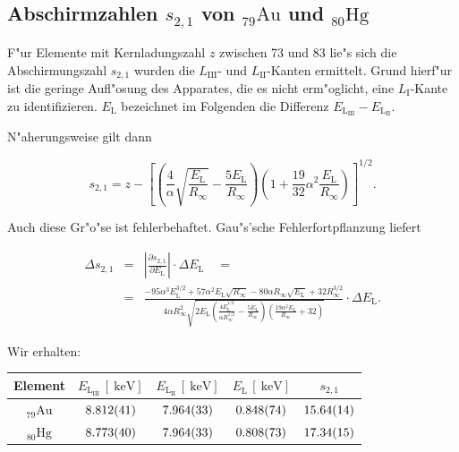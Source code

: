 	\subsection{Abschirmzahlen $s_{2,1}$ von ${}_{79}^{}\mathrm{Au}$ und ${}_{80}^{}\mathrm{Hg}$}
		\label{subsec:abschirm2}
		F"ur Elemente mit Kernladungszahl $z$ zwischen 73 und 83 lie"s sich die Abschirmungszahl $s_{2,1}$ wurden die $L_\mathrm{III}$- und $L_\mathrm{II}$-Kanten ermittelt.
		Grund hierf"ur ist die geringe Aufl"osung des Apparates, die es nicht erm"oglicht, eine $L_\mathrm{I}$-Kante zu identifizieren.
		$E_\mathrm{L}$ bezeichnet im Folgenden die Differenz $E_\mathrm{L_\mathrm{III}} - E_\mathrm{L_\mathrm{II}}$.
		
		N"aherungsweise gilt dann

		\begin{equation}
			s_{2,1} = z - \left[\left( \frac{4}{\alpha} \sqrt{\frac{E_\mathrm{L}}{R_\infty}} - \frac{5 E_\mathrm{L}}{R_\infty} \right)
			\left( 1 + \frac{19}{32}\alpha^2 \frac{E_\mathrm{L}}{R_\infty} \right)\right]^{1/2} . \nonumber
		\end{equation}

		Auch diese Gr"o"se ist fehlerbehaftet. Gau"s'sche Fehlerfortpflanzung liefert

		\begin{eqnarray*}
			\Delta s_{2,1} & = & \left|\frac{\partial s_{2,1}}{\partial E_\mathrm{L}}\right| \cdot \Delta E_\mathrm{L} \quad = \\
			& = & \frac{-95 \alpha^3 E_\mathrm{L}^{3/2} + 57 \alpha^2 E_\mathrm{L} \sqrt{R_\infty} - 80\alpha R_\infty \sqrt{E_\mathrm{L}} + 32 R_\infty^{3/2}}{4 \alpha R_\infty^2 \sqrt{2 E_\mathrm{L} \left( \frac{4E_\mathrm{L}^{1/2}}{\alpha R_\infty^{1/2}} - \frac{5E_\mathrm{L}}{R_\infty} \right) \left( \frac{19 \alpha^2 E_\mathrm{L}}{R_\infty} + 32 \right)}} \cdot \Delta E_\mathrm{L}.
		\end{eqnarray*}

		Wir erhalten:

		\begin{table}[h!]
			\centering
			\begin{tabular}{|c|c|c|c|c|}
				\hline
				Element & 
				$E_\mathrm{L_\mathrm{III}}\,[\SI{}{\kilo \electronvolt}]$ &
				$E_\mathrm{L_\mathrm{II}}\,[\SI{}{\kilo \electronvolt}]$ &
				$E_\mathrm{L}\,[\SI{}{\kilo \electronvolt}]$ & 
				$s_{2,1}$ \\
				\hline \hline
				${}_{79}^{}\mathrm{Au}$ & 
					$\SI{8.812 (41)}{}$ &
					$\SI{7.964 (33)}{}$ & 
					$\SI{.848 (74)}{}$ & 
					$\SI{15.64 (14)}{}$ \\
				${}_{80}^{}\mathrm{Hg}$ & 
					$\SI{8.773 (40)}{}$ &
					$\SI{7.964 (33)}{}$ &
					$\SI{.808 (73)}{}$ & 
					$\SI{17.34 (15)}{}$ \\
				\hline
			\end{tabular}
		\end{table}

